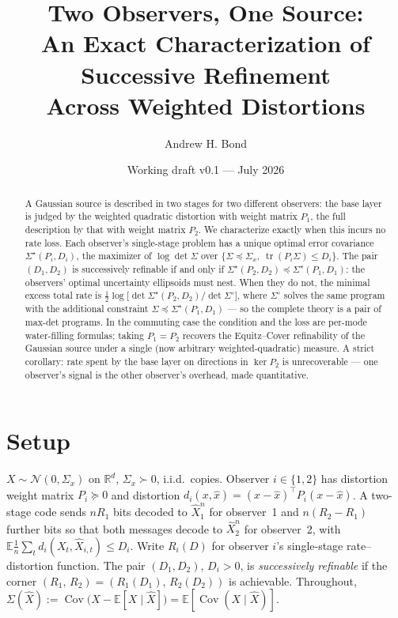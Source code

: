 \documentclass[11pt]{article}
\title{Two Observers, One Source:\\ An Exact Characterization of Successive
Refinement\\ Across Weighted Distortions}
\author{Andrew H. Bond}
\date{Working draft v0.1 --- July 2026}
\newcommand{\E}{\mathbb{E}}\newcommand{\tr}{\operatorname{tr}}
\newcommand{\Cov}{\operatorname{Cov}}
\begin{document}
\maketitle

\begin{abstract}
A Gaussian source is described in two stages for two different observers:
the base layer is judged by the weighted quadratic distortion with weight
matrix $P_1$, the full description by that with weight matrix $P_2$. We characterize exactly when
this incurs no rate loss. Each observer's single-stage problem has a unique
optimal error covariance $\Sigma^\star(P_i,D_i)$, the maximizer of
$\log\det\Sigma$ over $\{\Sigma\preceq\Sigma_x,\ \tr(P_i\Sigma)\le D_i\}$.
The pair $(D_1,D_2)$ is successively refinable if and only if
$\Sigma^\star(P_2,D_2)\preceq\Sigma^\star(P_1,D_1)$: the observers' optimal
uncertainty ellipsoids must nest. When they do not, the minimal excess total
rate is $\tfrac12\log\bigl[\det\Sigma^\star(P_2,D_2)/\det\Sigma^\circ\bigr]$,
where $\Sigma^\circ$ solves the same program with the additional constraint
$\Sigma\preceq\Sigma^\star(P_1,D_1)$ --- so the complete theory is a pair of
max-det programs. In the commuting case the condition and the loss are
per-mode water-filling formulas; taking $P_1=P_2$ recovers the
Equitz--Cover refinability of the Gaussian source under a single (now
arbitrary weighted-quadratic) measure. A strict corollary: rate spent by the
base layer on directions in $\ker P_2$ is unrecoverable --- one observer's
signal is the other observer's overhead, made quantitative.
\end{abstract}

\section{Setup}
$X\sim\mathcal N(0,\Sigma_x)$ on $\mathbb R^d$, $\Sigma_x\succ0$, i.i.d.\
copies. Observer $i\in\{1,2\}$ has distortion weight matrix $P_i\succeq0$ and distortion
$d_i(x,\hat x)=(x-\hat x)^\top P_i(x-\hat x)$. A two-stage code sends $nR_1$
bits decoded to $\hat X_1^n$ for observer~1 and $n(R_2-R_1)$ further bits so
that both messages decode to $\hat X_2^n$ for observer~2, with
$\E\frac1n\sum_t d_i(X_t,\hat X_{i,t})\le D_i$. Write $R_i(D)$ for observer
$i$'s single-stage rate--distortion function. The pair $(D_1,D_2)$,
$D_i>0$, is \emph{successively refinable} if the corner
$(R_1,\,R_2)=(R_1(D_1),\,R_2(D_2))$ is achievable. Throughout,
$\Sigma(\hat X):=\Cov\!\bigl(X-\E[X\mid\hat X]\bigr)=\E[\Cov(X\mid\hat X)]$.
\end{document}
